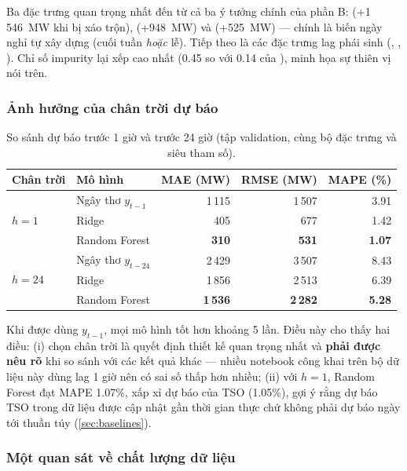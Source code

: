 Ba đặc trưng quan trọng nhất đến từ cả ba ý tưởng chính của phần B:
 (+1\,546~MW khi bị xáo trộn),  (+948~MW) và  (+525~MW) ---
chính là biến ngày nghỉ tự xây dựng (cuối tuần \emph{hoặc} lễ). Tiếp theo là các đặc trưng lag phái sinh
(, , ). Chỉ số impurity lại xếp 
cao nhất (0.45 so với 0.14 của ), minh họa sự thiên vị nói trên.

\subsubsection{Ảnh hưởng của chân trời dự báo}\label{sec:horizon}

\begin{table}[H]
\centering
\caption{So sánh dự báo trước 1 giờ và trước 24 giờ (tập validation, cùng bộ đặc trưng và siêu tham số).}\label{tab:horizon}
\begin{tabular}{llrrr}
\toprule
Chân trời & Mô hình & MAE (MW) & RMSE (MW) & MAPE (\%)\\
\midrule
\multirow{3}{*}{$h=1$} & Ngây thơ $y_{t-1}$ & 1\,115 & 1\,507 & 3.91\\
 & Ridge & 405 & 677 & 1.42\\
 & Random Forest & \textbf{310} & \textbf{531} & \textbf{1.07}\\
\midrule
\multirow{3}{*}{$h=24$} & Ngây thơ $y_{t-24}$ & 2\,429 & 3\,507 & 8.43\\
 & Ridge & 1\,856 & 2\,513 & 6.39\\
 & Random Forest & \textbf{1\,536} & \textbf{2\,282} & \textbf{5.28}\\
\bottomrule
\end{tabular}
\end{table}

Khi được dùng $y_{t-1}$, mọi mô hình tốt hơn khoảng 5 lần. Điều này cho thấy hai điều: (i) chọn chân trời
là quyết định thiết kế quan trọng nhất và \textbf{phải được nêu rõ} khi so sánh với các kết quả khác --- nhiều
notebook công khai trên bộ dữ liệu này dùng lag 1 giờ nên có sai số thấp hơn nhiều; (ii) với $h=1$, Random
Forest đạt MAPE 1.07\%, xấp xỉ dự báo của TSO (1.05\%), gợi ý rằng dự báo TSO trong dữ liệu được cập nhật gần
thời gian thực chứ không phải dự báo ngày tới thuần túy (\cref{sec:baselines}).

\subsubsection{Một quan sát về chất lượng dữ liệu}\label{sec:data-quirk}

